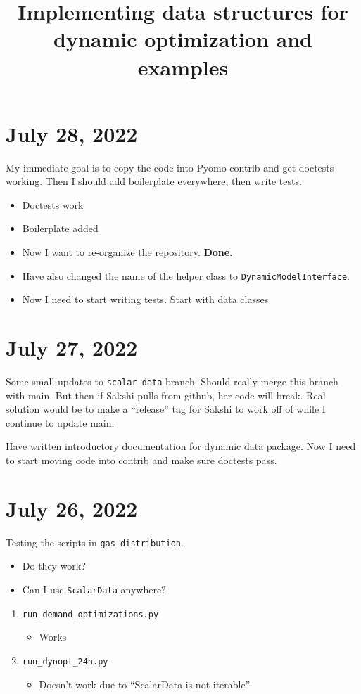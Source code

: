 \documentclass{article}
\title{Implementing data structures for dynamic optimization and examples}
\begin{document}
\maketitle

\section{July 28, 2022}

My immediate goal is to copy the code into Pyomo contrib and get doctests working.
Then I should add boilerplate everywhere, then write tests.
\begin{itemize}
  \item Doctests work
  \item Boilerplate added
  \item Now I want to re-organize the repository. {\bf Done.}
  \item Have also changed the name of the helper class to
    \texttt{DynamicModelInterface}.
  \item Now I need to start writing tests. Start with data classes
\end{itemize}

\section{July 27, 2022}

Some small updates to \texttt{scalar-data} branch.
Should really merge this branch with main. But then
if Sakshi pulls from github, her code will break.
Real solution would be to make a ``release'' tag for Sakshi
to work off of while I continue to update main.

\medskip

Have written introductory documentation for dynamic data
package. Now I need to start moving code into contrib and make
sure doctests pass.

\section{July 26, 2022}
Testing the scripts in \texttt{gas\_distribution}.
\begin{itemize}
  \item Do they work?
  \item Can I use \texttt{ScalarData} anywhere? 
\end{itemize}
\begin{enumerate}
  \item \texttt{run\_demand\_optimizations.py}
    \begin{itemize}
      \item Works
    \end{itemize}
  \item \texttt{run\_dynopt\_24h.py}
    \begin{itemize}
      \item Doesn't work due to ``ScalarData is not iterable''
    \end{itemize}
\end{enumerate}
\end{document}
